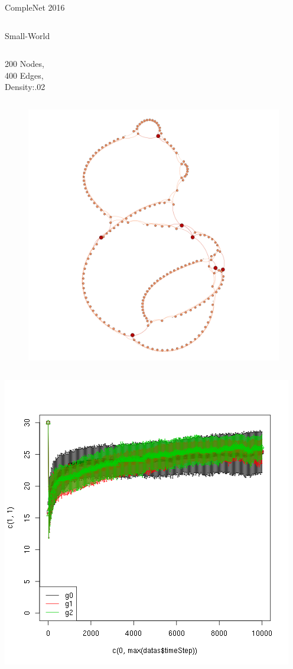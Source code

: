 \documentclass[9pt, handout=show,notes=show]{beamer}
\begin{document}
\begin{frame}{CompleNet 2016}
    \begin{center}
	\begin{columns}
	    \begin{column}{.5\textwidth}
		\begin{center}
		    Small-World
		\end{center}
		\begin{column}{.2\textwidth}
			\tiny
			200 Nodes,\\ 
			400 Edges,\\
			Density:.02
		\end{column}
		\begin{column}{.8\textwidth}
		    \begin{figure}
			\includegraphics[width=\textwidth]{images/graphSW.png}
		    \end{figure}
		\end{column}
		\begin{center}
		    \includegraphics[width=.6\textwidth]{images/scoreSW.png}

\end{center}
\end{column}
\end{columns}
\end{center}
\end{frame}
\end{document}
